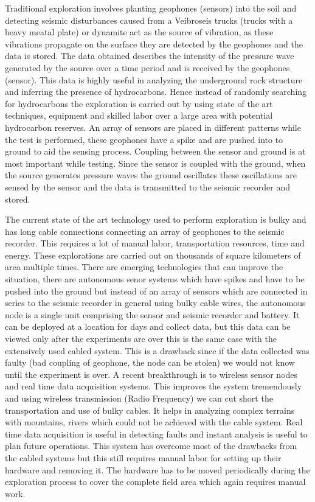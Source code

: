 \documentclass[conference]{IEEEtran}
\begin{document}
Traditional exploration involves planting geophones (sensors) into the soil and detecting seismic disturbances caused from a Veibroseis trucks (trucks with a heavy meatal plate) or dynamite act as the source of vibration, as these vibrations propagate on the surface they are detected by the geophones and the data is stored. The data obtained describes the intensity of the pressure wave generated by the source over a time period and is received by the geophones (sensor). This data is highly useful in analyzing the underground rock structure and inferring the presence of hydrocarbons. Hence instead of randomly searching for hydrocarbons the exploration is carried out by using state of the art techniques, equipment and skilled labor over a large area with potential hydrocarbon reserves. An array of sensors are placed in different patterns while the test is performed, these geophones have a spike and are pushed into to ground to aid the sensing process. Coupling between the sensor and ground is at most important while testing. Since the sensor is coupled with the ground, when the source generates pressure waves the ground oscillates these oscillations are sensed by the sensor and the data is transmitted to the seismic recorder and stored. 

The current state of the art technology used to perform exploration is bulky and has long cable connections connecting an array of geophones to the seismic recorder. This requires a lot of manual labor, transportation resources, time and energy. These explorations are carried out on thousands of square kilometers of area multiple times. There are emerging technologies that can improve the situation, there are autonomous senor systems which have spikes and have to be pushed into the ground but instead of an array of sensors which are connected in series to the seismic recorder in general using bulky cable wires, the autonomous node is a single unit comprising the sensor and seismic recorder and battery. It can be deployed at a location for days and collect data, but this data can be viewed only after the experiments are over this is the same case with the extensively used cabled system. This is a drawback since if the data collected was faulty (bad coupling of geophone, the node can be stolen) we would not know until the experiment is over. A recent breakthrough is to wireless sensor nodes and real time data acquisition systems. This improves the system tremendously and using wireless transmission (Radio Frequency) we can cut short the transportation and use of bulky cables. It helps in analyzing complex terrains with mountains, rivers which could not be achieved with the cable system. Real time data acquisition is useful in detecting faults and instant analysis is useful to plan future operations. This system has overcome most of the drawbacks from the cabled systems but this still requires manual labor for setting up their hardware and removing it. The hardware has to be moved periodically during the exploration process to cover the complete field area which again requires manual work. 
 
\end{document}
